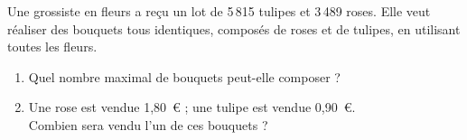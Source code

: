 
Une grossiste en fleurs a reçu un lot de 5\,815 tulipes et 3\,489 roses. Elle veut réaliser des bouquets tous identiques, composés de roses et de tulipes, en utilisant toutes les fleurs.
\begin{enumerate}
\item Quel nombre maximal de bouquets peut-elle composer ?
\item Une rose est vendue 1,80~\euro{} ; une tulipe est vendue 0,90~\euro{}.\\Combien sera vendu l'un de ces bouquets ?
\end{enumerate}
